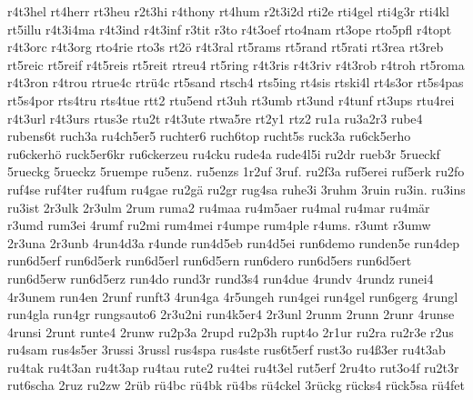 {    r4t3hel
    rt4herr
    rt3heu
    r2t3hi
    r4thony
    rt4hum
    r2t3i2d
    rti2e
    rti4gel
    rti4g3r
    rti4kl
    rt5illu
    r4t3i4ma
    r4t3ind
    r4t3inf
    r3tit
    r3to
    r4t3oef
    rto4nam
    rt3ope
    rto5pfl
    r4topt
    r4t3orc
    r4t3org
    rto4rie
    rto3s
    rt2ö
    r4t3ral
    rt5rams
    rt5rand
    rt5rati
    rt3rea
    rt3reb
    rt5reic
    rt5reif
    r4t5reis
    rt5reit
    rtreu4
    rt5ring
    r4t3ris
    r4t3riv
    r4t3rob
    r4troh
    rt5roma
    r4t3ron
    r4trou
    rtrue4c
    rtrü4c
    rt5sand
    rtsch4
    rts5ing
    rt4sis
    rtski4l
    rt4s3or
    rt5s4pas
    rt5s4por
    rts4tru
    rts4tue
    rtt2
    rtu5end
    rt3uh
    rt3umb
    rt3und
    r4tunf
    rt3ups
    rtu4rei
    r4t3url
    r4t3urs
    rtus3e
    rtu2t
    r4t3ute
    rtwa5re
    rt2y1
    rtz2
    ru1a
    ru3a2r3
    rube4
    rubens6t
    ruch3a
    ru4ch5er5
    ruchter6
    ruch6top
    rucht5s
    ruck3a
    ru6ck5erho
    ru6ckerhö
    ruck5er6kr
    ru6ckerzeu
    ru4cku
    rude4a
    rude4l5i
    ru2dr
    rueb3r
    5rueckf
    5rueckg
    5rueckz
    5ruempe
    ru5enz.
    ru5enzs
    1r2uf
    3ruf.
    ru2f3a
    ruf5erei
    ruf5erk
    ru2fo
    ruf4se
    ruf4ter
    ru4fum
    ru4gae
    ru2gä
    ru2gr
    rug4sa
    ruhe3i
    3ruhm
    3ruin
    ru3in.
    ru3ins
    ru3ist
    2r3ulk
    2r3ulm
    2rum
    ruma2
    ru4maa
    ru4m5aer
    ru4mal
    ru4mar
    ru4mär
    r3umd
    rum3ei
    4rumf
    ru2mi
    rum4mei
    r4umpe
    rum4ple
    r4ums.
    r3umt
    r3umw
    2r3una
    2r3unb
    4run4d3a
    r4unde
    run4d5eb
    run4d5ei
    run6demo
    runden5e
    run4dep
    run6d5erf
    run6d5erk
    run6d5erl
    run6d5ern
    run6dero
    run6d5ers
    run6d5ert
    run6d5erw
    run6d5erz
    run4do
    rund3r
    rund3s4
    run4due
    4rundv
    4rundz
    runei4
    4r3unem
    run4en
    2runf
    runft3
    4run4ga
    4r5ungeh
    run4gei
    run4gel
    run6gerg
    4rungl
    run4gla
    run4gr
    rungsauto6
    2r3u2ni
    run4k5er4
    2r3unl
    2runm
    2runn
    2runr
    4runse
    4runsi
    2runt
    runte4
    2runw
    ru2p3a
    2rupd
    ru2p3h
    rupt4o
    2r1ur
    ru2ra
    ru2r3e
    r2us
    ru4sam
    rus4s5er
    3russi
    3russl
    rus4spa
    rus4ste
    rus6t5erf
    rust3o
    ru4ß3er
    ru4t3ab
    ru4tak
    ru4t3an
    ru4t3ap
    ru4tau
    rute2
    ru4tei
    ru4t3el
    rut5erf
    2ru4to
    rut3o4f
    ru2t3r
    rut6scha
    2ruz
    ru2zw
    2rüb
    rü4bc
    rü4bk
    rü4bs
    rü4ckel
    3rückg
    rücks4
    rück5sa
    rü4fet
}
